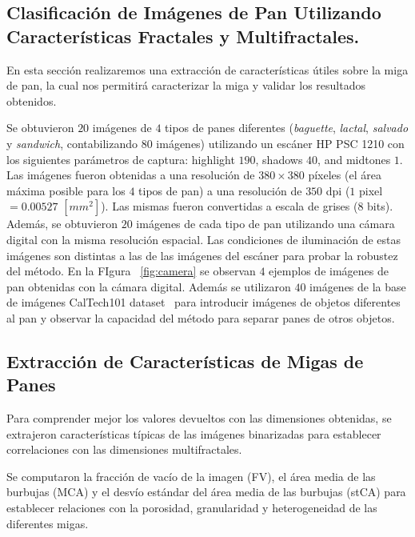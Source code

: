 \documentclass[spanish,a4paper,11pt,oneside,links]{report}
\begin{document}
\subsection{Clasificación de Imágenes de Pan Utilizando Características Fractales y Multifractales.}



En esta sección realizaremos una extracción de características útiles sobre la miga de pan, la cual nos permitirá caracterizar la miga y validar los resultados obtenidos.


Se obtuvieron $20$ imágenes de $4$ tipos de panes diferentes ({\em baguette}, {\em lactal}, {\em salvado} y {\em sandwich}, contabilizando $80$ imágenes) utilizando un escáner HP PSC 1210 con los siguientes parámetros de captura:  highlight $190$, shadows $40$, and midtones $1$. Las imágenes fueron obtenidas a una resolución de $380\times 380$ píxeles (el área máxima posible para los $4$ tipos de pan) a una resolución de $350$ dpi ($1$ pixel $= 0.00527$ $[mm^{2}]$). Las mismas fueron convertidas a escala de grises ($8$ bits). Además, se obtuvieron $20$ imágenes de cada tipo de pan utilizando una cámara digital con la misma resolución espacial. Las condiciones de iluminación de estas imágenes son distintas a las de las imágenes del escáner para probar la robustez del método. En la FIgura ~\ref{fig:camera} se observan $4$ ejemplos de imágenes de pan obtenidas con la cámara digital. Además se utilizaron $40$ imágenes de la base de imágenes CalTech101 dataset~\cite{FeiFei04} para introducir imágenes de objetos diferentes al pan y observar la capacidad del método para separar panes de otros objetos.

\subsection{Extracción de Características de Migas de Panes}
Para comprender mejor los valores devueltos con las dimensiones obtenidas, se extrajeron características típicas de las imágenes binarizadas para establecer correlaciones con las dimensiones multifractales.

Se computaron la fracción de vacío de la imagen (FV), el área media de las burbujas (MCA) y el desvío estándar del área media de las burbujas (stCA) para establecer relaciones con la porosidad, granularidad y heterogeneidad de las diferentes migas.
\end{document}

